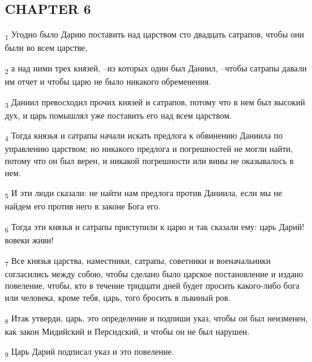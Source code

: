 \subsection{CHAPTER 6}
\begin{tcolorbox}
\textsubscript{1} Угодно было Дарию поставить над царством сто двадцать сатрапов, чтобы они были во всем царстве,
\end{tcolorbox}
\begin{tcolorbox}
\textsubscript{2} а над ними трех князей, --из которых один был Даниил, --чтобы сатрапы давали им отчет и чтобы царю не было никакого обременения.
\end{tcolorbox}
\begin{tcolorbox}
\textsubscript{3} Даниил превосходил прочих князей и сатрапов, потому что в нем был высокий дух, и царь помышлял уже поставить его над всем царством.
\end{tcolorbox}
\begin{tcolorbox}
\textsubscript{4} Тогда князья и сатрапы начали искать предлога к обвинению Даниила по управлению царством; но никакого предлога и погрешностей не могли найти, потому что он был верен, и никакой погрешности или вины не оказывалось в нем.
\end{tcolorbox}
\begin{tcolorbox}
\textsubscript{5} И эти люди сказали: не найти нам предлога против Даниила, если мы не найдем его против него в законе Бога его.
\end{tcolorbox}
\begin{tcolorbox}
\textsubscript{6} Тогда эти князья и сатрапы приступили к царю и так сказали ему: царь Дарий! вовеки живи!
\end{tcolorbox}
\begin{tcolorbox}
\textsubscript{7} Все князья царства, наместники, сатрапы, советники и военачальники согласились между собою, чтобы сделано было царское постановление и издано повеление, чтобы, кто в течение тридцати дней будет просить какого-либо бога или человека, кроме тебя, царь, того бросить в львиный ров.
\end{tcolorbox}
\begin{tcolorbox}
\textsubscript{8} Итак утверди, царь, это определение и подпиши указ, чтобы он был неизменен, как закон Мидийский и Персидский, и чтобы он не был нарушен.
\end{tcolorbox}
\begin{tcolorbox}
\textsubscript{9} Царь Дарий подписал указ и это повеление.
\end{tcolorbox}
